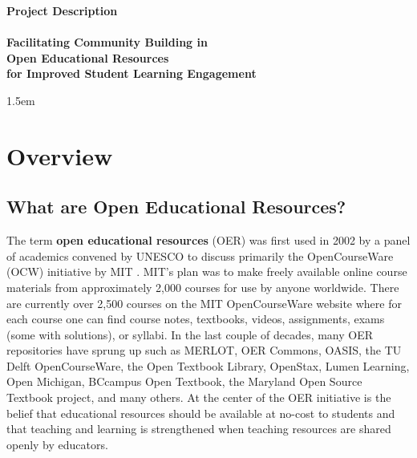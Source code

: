 \documentclass[11pt]{article}
\begin{document}
\begin{center}
\textbf{\Large Project Description}\\[0.25cm]
\hrulefill\\[0.25cm]
\textbf{\Large Facilitating Community Building in \\[0.2ex] Open Educational Resources \\[0.8ex] for Improved Student Learning Engagement}\\
\hrulefill
\end{center}
\baselineskip 1.5em

\section{Overview}

\subsection{What are Open Educational Resources?}
The term \textbf{open educational resources} (OER) was first used in 2002 by a panel of academics convened by UNESCO to discuss primarily the OpenCourseWare (OCW) initiative by MIT \cite{unescoforum:02, oerguidelines}.  MIT's plan was to make freely available online course materials from approximately 2,000 courses for use by anyone worldwide.  There are currently over 2,500 courses on the MIT OpenCourseWare website where for each course one can find course notes, textbooks, videos, assignments, exams (some with solutions), or syllabi.  In the last couple of decades, many OER repositories have sprung up such as MERLOT, OER Commons, OASIS, the TU Delft OpenCourseWare, the Open Textbook Library, OpenStax, Lumen Learning, Open Michigan, BCcampus Open Textbook, the Maryland Open Source Textbook project, and many others.  At the center of the OER initiative is the belief that educational resources should be available at no-cost to students and that teaching and learning is strengthened when teaching resources are shared openly by educators.
\end{document}
